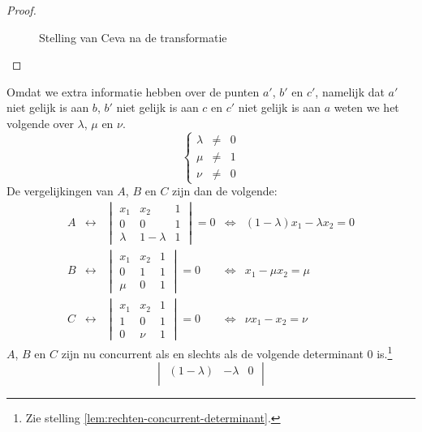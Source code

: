 \documentclass[main.tex]{subfiles}
\begin{document}
\begin{st}
\begin{proof}
\begin{figure}[H]
    \caption{Stelling van Ceva na de transformatie}
    \label{fig:stelling-van-ceva-na}
  \end{figure}
  \end{proof}
  Omdat we extra informatie hebben over de punten $a'$, $b'$ en $c'$, namelijk dat $a'$ niet gelijk is aan $b$, $b'$ niet gelijk is aan $c$ en $c'$ niet gelijk is aan $a$ weten we het volgende over $\lambda$, $\mu$ en $\nu$.
  \[
  \left\{
  \begin{array}{rcl}
    \lambda &\neq & 0\\ 
    \mu &\neq & 1\\
    \nu &\neq & 0
  \end{array}
  \right.
  \]
  De vergelijkingen van $A$, $B$ en $C$ zijn dan de volgende:
  \[
  \begin{array}{rclcl}
  A &\leftrightarrow &
  \begin{vmatrix}
    x_{1} & x_{2} & 1\\
    0 & 0 & 1\\
    \lambda & 1-\lambda & 1
  \end{vmatrix}
  = 0
  &\Leftrightarrow&
  (1-\lambda)x_{1} - \lambda x_{2} = 0
\\
  B &\leftrightarrow &
  \begin{vmatrix}
    x_{1} & x_{2} & 1\\
    0 & 1 & 1\\
    \mu & 0 & 1
  \end{vmatrix}
  = 0
  &\Leftrightarrow&
  x_{1} - \mu x_{2} = \mu
\\
  C &\leftrightarrow &
  \begin{vmatrix}
    x_{1} & x_{2} & 1\\
    1 & 0 & 1\\
    0 & \nu & 1
  \end{vmatrix}
  = 0
  &\Leftrightarrow&
  \nu x_{1} - x_{2} = \nu
  \end{array}
  \]
  $A$, $B$ en $C$ zijn nu concurrent als en slechts als de volgende determinant $0$ is.\footnote{Zie stelling \ref{lem:rechten-concurrent-determinant}.}
  \[
  \begin{vmatrix}
    (1-\lambda) & -\lambda & 0 \\

\end{vmatrix}\]
\end{st}
\end{document}

